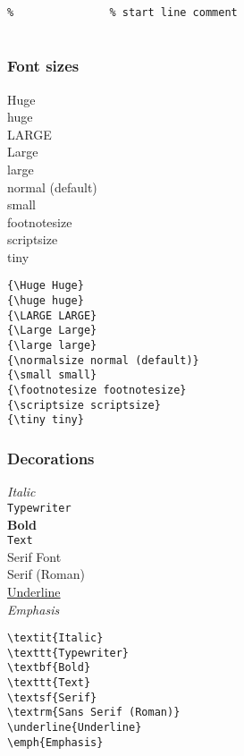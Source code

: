 \documentclass[a4paper,11pt,fleqn]{book}
\begin{document}
\begin{enumerate}
\begin{verbatim}
%               % start line comment


\end{verbatim}

\subsubsection{Font sizes}
\begin{multicols}{2}
  {\Huge Huge}\\{\huge huge}\\{\LARGE LARGE}\\{\Large Large}\\{\large large}\\{\normalsize normal (default)}\\{\small small}\\{\footnotesize footnotesize}\\{\scriptsize scriptsize}\\{\tiny tiny}

  \vfill\null\columnbreak

  \begin{verbatim}
{\Huge Huge}
{\huge huge}
{\LARGE LARGE}
{\Large Large}
{\large large}
{\normalsize normal (default)}
{\small small}
{\footnotesize footnotesize}
{\scriptsize scriptsize}
{\tiny tiny}
  \end{verbatim}
\end{multicols}

\subsubsection{Decorations}
\begin{multicols}{2}
  \textit{Italic}\\\texttt{Typewriter}\\\textbf{Bold}\\\texttt{Text}\\\textsf{Serif Font}\\\textrm{Serif (Roman)}\\\underline{Underline}\\\emph{Emphasis}\\

  \vfill\null\columnbreak

  \begin{verbatim}
\textit{Italic}
\texttt{Typewriter}
\textbf{Bold}
\texttt{Text}
\textsf{Serif}
\textrm{Sans Serif (Roman)}
\underline{Underline}
\emph{Emphasis}
  \end{verbatim}
\end{multicols}


\end{enumerate}
\end{document}
